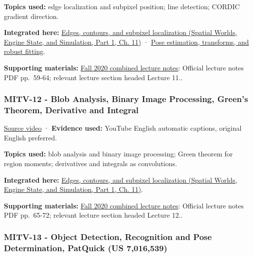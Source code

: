 \textbf{Topics used:} edge localization and subpixel position; line detection; CORDIC gradient direction.

\textbf{Integrated here:} \href{../05-Spatial-Worlds-Engine-State-and-Simulation-P01/main.pdf\#04-visual-computing-ii-ch030-edges-contours-and-subpixel-localization}{Edges, contours, and subpixel localization (Spatial Worlds, Engine State, and Simulation, Part 1, Ch. 11)} · \hyperref[04-visual-computing-ii-ch032-pose-estimation-transforms-and-robust-fitting]{Pose estimation, transforms, and robust fitting}.

\textbf{Supporting materials:} \href{https://ocw.mit.edu/courses/6-801-machine-vision-fall-2020/9ec44f69e72995c370b3797818ba01e6_MIT6_801F20_lectureNotes.pdf}{Fall 2020 combined lecture notes}: Official lecture notes PDF pp.~59-64; relevant lecture section headed Lecture 11..

\subsubsection{MITV-12 - Blob Analysis, Binary Image Processing, Green's Theorem, Derivative and Integral}\label{04-visual-computing-ii-ch036-mitv-12---blob-analysis-binary-image-processing-greens-theorem-derivative-and-integral}

\hypertarget{04-visual-computing-ii-ch036-mitv-12---blob-analysis-binary-image-processing-greens-theorem-derivative-and-integral}{}

\href{https://www.youtube.com/watch?v=jLvgNmGuxGk}{Source video} · \textbf{Evidence used:} YouTube English automatic captions, original English preferred.

\textbf{Topics used:} blob analysis and binary image processing; Green theorem for region moments; derivatives and integrals as convolutions.

\textbf{Integrated here:} \href{../05-Spatial-Worlds-Engine-State-and-Simulation-P01/main.pdf\#04-visual-computing-ii-ch030-edges-contours-and-subpixel-localization}{Edges, contours, and subpixel localization (Spatial Worlds, Engine State, and Simulation, Part 1, Ch. 11)}.

\textbf{Supporting materials:} \href{https://ocw.mit.edu/courses/6-801-machine-vision-fall-2020/9ec44f69e72995c370b3797818ba01e6_MIT6_801F20_lectureNotes.pdf}{Fall 2020 combined lecture notes}: Official lecture notes PDF pp.~65-72; relevant lecture section headed Lecture 12..

\subsubsection{MITV-13 - Object Detection, Recognition and Pose Determination, PatQuick (US 7,016,539)}\label{04-visual-computing-ii-ch036-mitv-13---object-detection-recognition-and-pose-determination-patquick-us-7016539}

